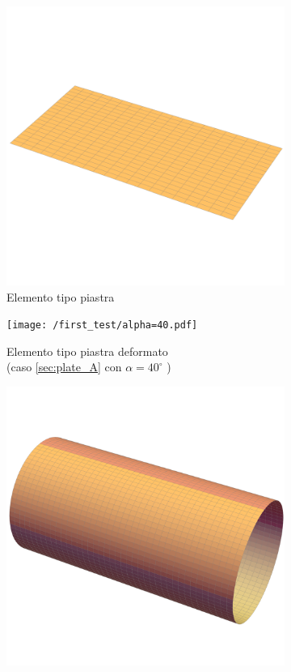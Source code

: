 \documentclass[a4paper,num-refs]{oup-contemporary}
\begin{document}
\begin{figure}[bt!]
	\centering
	\begin{subfigure}[t]{0.24\textwidth}
		\centering

 \includegraphics[width=\textwidth]{plate_.pdf}
 				\caption{Elemento tipo piastra}
		\label{fig:y equals x}
	\end{subfigure}
	\hfill
	\begin{subfigure}[t]{0.24\textwidth}
		\centering
		\texttt{[image: /first\_test/alpha=40.pdf]}
		\caption{Elemento tipo piastra deformato \\(caso \cref{sec:plate_A}  con $\alpha=40^\circ$ )}
		\label{fig:five over x}
	\end{subfigure}
	\hfill
	\begin{subfigure}[t]{0.24\textwidth}
		\centering
 \includegraphics[width=\textwidth]{cyl_.pdf}

\end{subfigure}
\end{figure}
\end{document}
